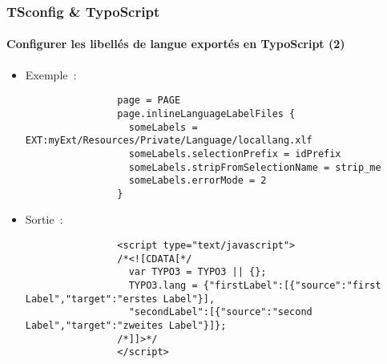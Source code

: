 \begin{frame}[fragile]
	\frametitle{TSconfig \& TypoScript}
	\framesubtitle{Configurer les libellés de langue exportés en TypoScript (2)}

	\lstset{basicstyle=\tiny\ttfamily}

	\begin{itemize}

		\item Exemple~:

			\begin{lstlisting}
				page = PAGE
				page.inlineLanguageLabelFiles {
				  someLabels = EXT:myExt/Resources/Private/Language/locallang.xlf
				  someLabels.selectionPrefix = idPrefix
				  someLabels.stripFromSelectionName = strip_me
				  someLabels.errorMode = 2
				}
			\end{lstlisting}

		\item Sortie~:

			\begin{lstlisting}
				<script type="text/javascript">
				/*<![CDATA[*/
				  var TYPO3 = TYPO3 || {};
				  TYPO3.lang = {"firstLabel":[{"source":"first Label","target":"erstes Label"}],
				  "secondLabel":[{"source":"second Label","target":"zweites Label"}]};
				/*]]>*/
				</script>
			\end{lstlisting}

	\end{itemize}

\end{frame}

